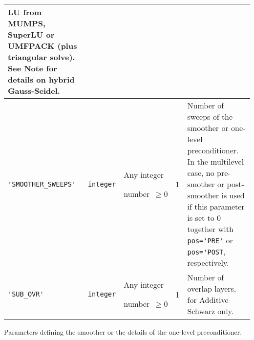 \begin{center}
\begin{tabular}{|p{3.6cm}|l|p{1.9cm}|p{3.6cm}|p{6.5cm}|}
                           LU from MUMPS, SuperLU or UMFPACK
                           (plus triangular solve). See Note for details on hybrid
                           Gauss-Seidel. \\ \hline
\verb|'SMOOTHER_SWEEPS'|  & \verb|integer|
                         & Any integer \par number~$\ge 0$
                         & 1
                         & Number of sweeps of the smoother or one-level preconditioner.
                            In the multilevel case, no pre-smother or
                            post-smoother is used if this parameter is set to 0
                            together with \verb|pos='PRE'| or \verb|pos='POST|,
                           respectively. \\ \hline
\verb|'SUB_OVR'|  & \verb|integer|
                         & Any integer \par number~$\ge 0$
                         & 1
                         & Number of overlap layers, for Additive Schwarz only. \\
\hline
\end{tabular}
\end{center}
\caption{Parameters defining the smoother or the details of the one-level preconditioner.
\label{tab:p_smoother}}
\esideways

